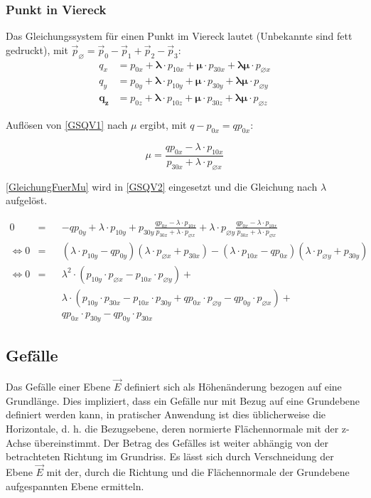 \subsubsection{Punkt in Viereck}
Das Gleichungssystem für einen Punkt im Viereck lautet (Unbekannte sind fett gedruckt), mit $\vec{p}_{\varnothing} = \vec{p}_{0} - \vec{p}_{1} + \vec{p}_{2} - \vec{p}_{3}$:
\begin{align}
	\label{GSQV1} q_{x} &= p_{0x} + \bm{\lambda} \cdot p_{10x} + \bm{\mu} \cdot p_{30x} + \bm{\lambda}\bm{\mu} \cdot p_{\varnothing x} \\
	\label{GSQV2} q_{y} &= p_{0y} + \bm{\lambda} \cdot p_{10y} + \bm{\mu} \cdot p_{30y} + \bm{\lambda}\bm{\mu} \cdot p_{\varnothing y} \\
	\label{GSQV3} \bm{q_{z}} &= p_{0z} + \bm{\lambda} \cdot p_{10z} + \bm{\mu} \cdot p_{30z} + \bm{\lambda}\bm{\mu} \cdot p_{\varnothing z}
\end{align}

Auflösen von \cref{GSQV1} nach $\mu$ ergibt, mit $q-p_{0x}=qp_{0x}$:

\begin{equation}
	\label{GleichungFuerMu}
	\mu = \frac{qp_{0x}-\lambda \cdot p_{10x}}{p_{30x}+\lambda \cdot p_{\varnothing x}}
\end{equation}

\cref{GleichungFuerMu} wird in \cref{GSQV2} eingesetzt und die Gleichung nach $\lambda$ aufgelöst.

\begin{align}
	\nonumber 0 &=&&-qp_{0y}+\lambda \cdot p_{10y}+p_{30y}\frac{qp_{0x}-\lambda \cdot p_{10x}}{p_{30x}+\lambda \cdot p_{\varnothing x}} + \lambda \cdot p_{\varnothing y} \frac{qp_{0x}-\lambda \cdot p_{10x}}{p_{30x}+\lambda \cdot p_{\varnothing x}} \\
	\nonumber \iff 0 &=&&(\lambda \cdot p_{10y}-qp_{0y})(\lambda \cdot p_{\varnothing x}+p_{30x})-(\lambda \cdot p_{10x}-qp_{0x})(\lambda \cdot p_{\varnothing y}+p_{30y}) \\
	\nonumber \iff 0 &=&&\lambda ^{2} \cdot (p_{10y} \cdot p_{\varnothing x} - p_{10x} \cdot p_{\varnothing y})+\\
	\nonumber & &&\lambda \cdot (p_{10y}\cdot p_{30x}-p_{10x}\cdot p_{30y}+qp_{0x}\cdot p_{\varnothing y}-qp_{0y}\cdot p_{\varnothing x})+\\
	\nonumber & &&qp_{0x}\cdot p_{30y}-qp_{0y}\cdot p_{30x}
\end{align}

\subsection{Gefälle}
Das Gefälle einer Ebene $\vec{E}$ definiert sich als Höhenänderung bezogen auf eine Grundlänge. Dies impliziert, dass ein Gefälle nur mit Bezug auf eine Grundebene definiert werden kann, in pratischer Anwendung ist dies üblicherweise die Horizontale, d. h. die Bezugsebene, deren normierte Flächennormale mit der z-Achse übereinstimmt. Der Betrag des Gefälles ist weiter abhängig von der betrachteten Richtung im Grundriss. Es lässt sich durch Verschneidung der Ebene $\vec{E}$ mit der, durch die Richtung und die Flächennormale der Grundebene aufgespannten Ebene ermitteln.

